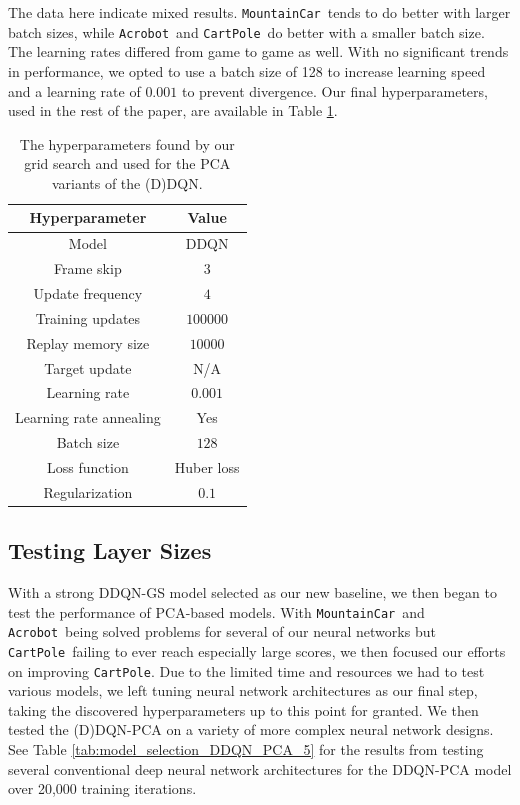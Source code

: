 \documentclass[11pt]{article}
\newcommand{\cp}{\texttt{CartPole}}
\newcommand{\ab}{\texttt{Acrobot}}
\newcommand{\mc}{\texttt{MountainCar}}
\begin{document}
The data here indicate mixed results. \mc~tends to do better with larger batch sizes, while \ab~and \cp~do better with a smaller batch size. The learning rates differed from game to game as well. With no significant trends in performance, we opted to use a batch size of 128 to increase learning speed and a learning rate of $0.001$ to prevent divergence. Our final hyperparameters, used in the rest of the paper, are available in Table \ref{tab:grid_search_hyperparameters}.

\begin{table}[!ht]
    \footnotesize
    \centering
    \begin{tabular}{c|c}
        \toprule
        Hyperparameter & Value \\ \midrule
        Model & DDQN \\
        Frame skip & $3$ \\
        Update frequency & $4$ \\
        Training updates & $100000$ \\
        Replay memory size & $10000$ \\
        Target update & N/A \\
        Learning rate & $0.001$ \\
        Learning rate annealing & Yes \\
        Batch size & $128$ \\
        Loss function & Huber loss \\
        Regularization & $0.1$ \\
        \bottomrule
    \end{tabular}
    \caption{The hyperparameters found by our grid search and used for the PCA variants of the (D)DQN.}
    \label{tab:grid_search_hyperparameters}
\end{table}

\subsection{Testing Layer Sizes}

With a strong DDQN-GS model selected as our new baseline, we then began to test the performance of PCA-based models. With \mc~and \ab~being solved problems for several of our neural networks but \cp~failing to ever reach especially large scores, we then focused our efforts on improving \cp. Due to the limited time and resources we had to test various models, we left tuning neural network architectures as our final step, taking the discovered hyperparameters up to this point for granted. We then tested the (D)DQN-PCA on a variety of more complex neural network designs. See Table \ref{tab:model_selection_DDQN_PCA_5} for the results from testing several conventional deep neural network architectures for the DDQN-PCA model over 20,000 training iterations.
\end{document}
